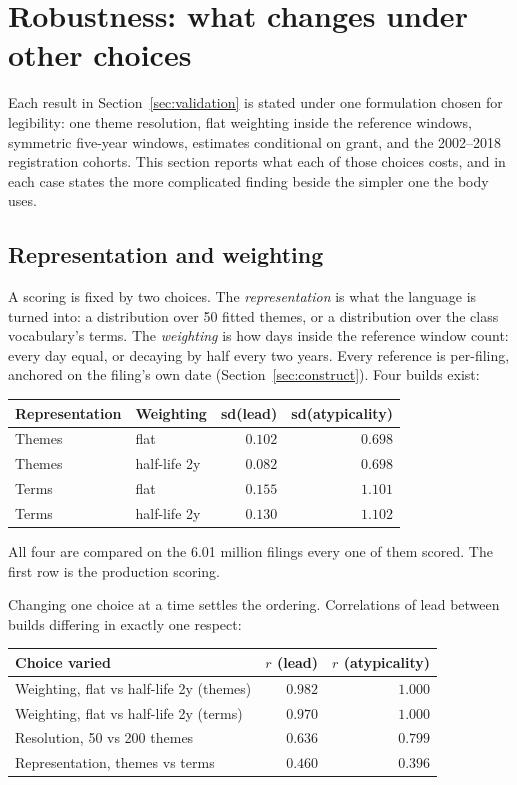 \section{Robustness: what changes under other choices}\label{sec:robust}

Each result in Section~\ref{sec:validation} is stated under one formulation chosen for legibility: one
theme resolution, flat weighting inside the reference windows, symmetric
five-year windows, estimates conditional on grant, and the 2002--2018
registration cohorts. This section reports what each of those choices costs,
and in each case states the more complicated finding beside the simpler one
the body uses.

\subsection{Representation and weighting}

A scoring is fixed by two choices. The \emph{representation} is what the
language is turned into: a distribution over 50 fitted themes, or a
distribution over the class vocabulary's terms. The \emph{weighting} is
how days inside the reference window count: every day equal, or decaying
by half every two years. Every reference is per-filing, anchored on the
filing's own date (Section~\ref{sec:construct}). Four builds exist:

\begin{center}\small
\begin{tabular}{llrr}
\toprule
Representation & Weighting & sd(lead) & sd(atypicality) \\
\midrule
Themes & flat          & $0.102$ & $0.698$ \\
Themes & half-life 2y  & $0.082$ & $0.698$ \\
Terms  & flat          & $0.155$ & $1.101$ \\
Terms  & half-life 2y  & $0.130$ & $1.102$ \\
\bottomrule
\end{tabular}
\end{center}

\noindent All four are compared on the 6.01 million filings every one of
them scored. The first row is the production scoring.

Changing one choice at a time settles the ordering. Correlations of lead
between builds differing in exactly one respect:

\begin{center}\small
\begin{tabular}{lrr}
\toprule
Choice varied & $r$ (lead) & $r$ (atypicality) \\
\midrule
Weighting, flat vs half-life 2y (themes)  & $0.982$ & $1.000$ \\
Weighting, flat vs half-life 2y (terms)   & $0.970$ & $1.000$ \\
Resolution, 50 vs 200 themes\footnotemark              & $0.636$ & $0.799$ \\
Representation, themes vs terms           & $0.460$ & $0.396$ \\
\bottomrule
\end{tabular}
\end{center}

